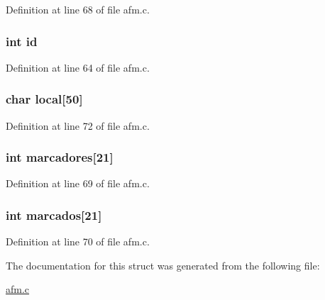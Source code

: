 \-Definition at line 68 of file afm.\-c.

\hypertarget{structresultado_a7441ef0865bcb3db9b8064dd7375c1ea}{
\subsubsection[{id}]{\setlength{\rightskip}{0pt plus 5cm}int {\bf id}}}\label{structresultado_a7441ef0865bcb3db9b8064dd7375c1ea}


\-Definition at line 64 of file afm.\-c.

\hypertarget{structresultado_ad0fbc2e59205ea604d8a9bac33ed9473}{
\subsubsection[{local}]{\setlength{\rightskip}{0pt plus 5cm}char {\bf local}\mbox{[}50\mbox{]}}}\label{structresultado_ad0fbc2e59205ea604d8a9bac33ed9473}


\-Definition at line 72 of file afm.\-c.

\hypertarget{structresultado_aa291c72d9a8809f53432613048a6fdfb}{
\subsubsection[{marcadores}]{\setlength{\rightskip}{0pt plus 5cm}int {\bf marcadores}\mbox{[}21\mbox{]}}}\label{structresultado_aa291c72d9a8809f53432613048a6fdfb}


\-Definition at line 69 of file afm.\-c.

\hypertarget{structresultado_a4e7b44437e808dd2fd5e173d52e71002}{
\subsubsection[{marcados}]{\setlength{\rightskip}{0pt plus 5cm}int {\bf marcados}\mbox{[}21\mbox{]}}}\label{structresultado_a4e7b44437e808dd2fd5e173d52e71002}


\-Definition at line 70 of file afm.\-c.



\-The documentation for this struct was generated from the following file\-:\begin{DoxyCompactItemize}
\item 
\hyperlink{afm_8c}{afm.\-c}\end{DoxyCompactItemize}
